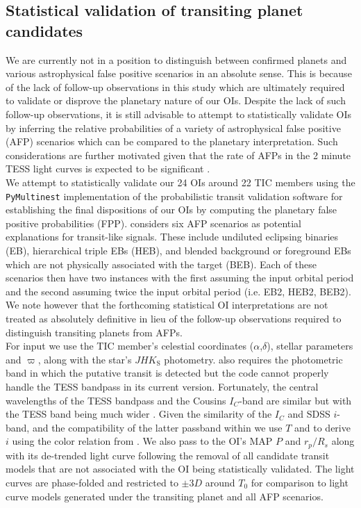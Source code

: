 \subsection{Statistical validation of transiting planet candidates} \label{sect:vespa}
We are currently not in a position to distinguish between confirmed planets and various astrophysical false
positive scenarios in an absolute sense. This is because of the lack of follow-up observations in this study
which are ultimately required to validate or disprove the planetary nature of our OIs. 
Despite the lack of such follow-up observations, it is still advisable to attempt to statistically
validate OIs by inferring the relative probabilities of a variety of astrophysical false
positive (AFP) scenarios which can be compared to the planetary interpretation.
Such considerations are further motivated given that the rate of AFPs in
the 2 minute TESS light curves is expected to be significant \citep[$\sim 60$\%;][]{sullivan15}. \\

We attempt to statistically validate our 24 OIs around 22 TIC members using the \texttt{PyMultinest}
\citep{buchner14} implementation of the probabilistic transit validation software
\vespa{} \citep{morton12,morton15} for establishing the final dispositions of our OIs
by computing the planetary false positive probabilities (FPP).
\vespa{} considers six AFP scenarios as potential explanations for transit-like
signals. These include undiluted eclipsing binaries (EB), hierarchical triple EBs (HEB), and blended
background or foreground EBs which are not physically associated with the target (BEB). Each of
these scenarios then have two instances with the first assuming the input orbital period and the
second assuming twice the input orbital period (i.e. EB2, HEB2, BEB2).
We note however that the forthcoming statistical OI interpretations are not treated as absolutely
definitive in lieu of the follow-up observations required to distinguish transiting planets from AFPs. \\

For \vespa{} input we use the TIC member's celestial coordinates ($\alpha$,$\delta$),
stellar parameters \teff{,} \logg{,} and $\varpi$, along
with the star's $JHK_{\text{S}}$ photometry. \vespa{} also requires the photometric band in which the
putative transit is detected but the code cannot properly handle the TESS bandpass in its current
version. Fortunately, the central wavelengths of the TESS bandpass and the Cousins $I_C$-band
are similar but with the TESS band being much wider \citep{sullivan15}. Given the similarity of the
$I_C$ and SDSS $i$-band, and the compatibility of the latter passband within \vespa{,} we use $T$ and
\Ks{} to derive $i$ using the color relation from \cite{muirhead18}. We also pass to \vespa{} the
OI's MAP $P$ and $r_p/R_s$ along with 
its de-trended light curve following the removal of all candidate transit models that are not associated
with the OI being statistically validated. The light curves are phase-folded and restricted
to $\pm 3D$ around $T_0$ for comparison to light curve models generated under the transiting planet
and all AFP scenarios. \\

